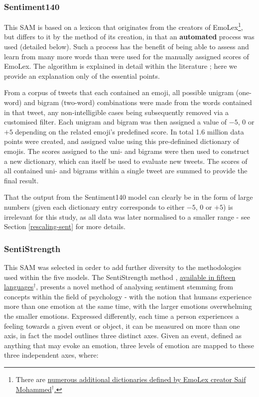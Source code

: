 \documentclass{article}
\begin{document}
\subsubsection{Sentiment140}
\label{sec-4-4-2}

This SAM is based on a lexicon that originates from the creators of EmoLex\footnote{There are \href{http://saifmohammad.com/WebPages/lexicons.html}{numerous additional dictionaries defined by EmoLex creator Saif Mohammed$^{\dag{}}$.}}, but differs to it by the method of its creation, in that an \textbf{automated} process was used (detailed below). Such a process has the benefit of being able to assess and learn from many more words than were used for the manually assigned scores of EmoLex. The algorithm is explained in detail within the literature \cite{MohammadKZ2013}; here we provide an explanation only of the essential points.

From a corpus of tweets that each contained an emoji, all possible unigram (one-word) and bigram (two-word) combinations were made from the words contained in that tweet, any non-intelligible cases being subsequently removed via a customised filter. Each unigram and bigram was then assigned a value of $-5$, $0$ or $+5$ depending on the related emoji's predefined score. In total 1.6 million data points were created, and assigned value using this pre-definined dictionary of emojis. The scores assigned to the uni- and bigrams were then used to construct a new dictionary, which can itself be used to evaluate new tweets. The scores of all contained uni- and bigrams within a single tweet are summed to provide the final result.

That the output from the Sentiment140 model can clearly be in the form of large numbers (given each dictionary entry corresponds to either $-5$, $0$ or $+5$) is irrelevant for this study, as all data was later normalised to a smaller range - see Section \ref{rescaling-sent} for more details.


\subsubsection{SentiStrength}
\label{sec-4-4-3}

This SAM was selected in order to add further diversity to the methodologies used within the five models. The SentiStrength method \cite{Thelwall:2010:SSS:1890706.1890713}, \href{http://sentistrength.wlv.ac.uk/}{available in fifteen languages$^{\dag{}}$}, presents a novel method of analysing sentiment stemming from concepts within the field of psychology - with the notion that humans experience more than one emotion at the same time, with the larger emotions overwhelming the smaller emotions. Expressed differently, each time a person experiences a feeling towards a given event or object, it can be measured on more than one axis, in fact the model outlines three distinct axes. Given an event, defined as anything that may evoke an emotion, three levels of emotion are mapped to these three independent axes, where:
\end{document}
